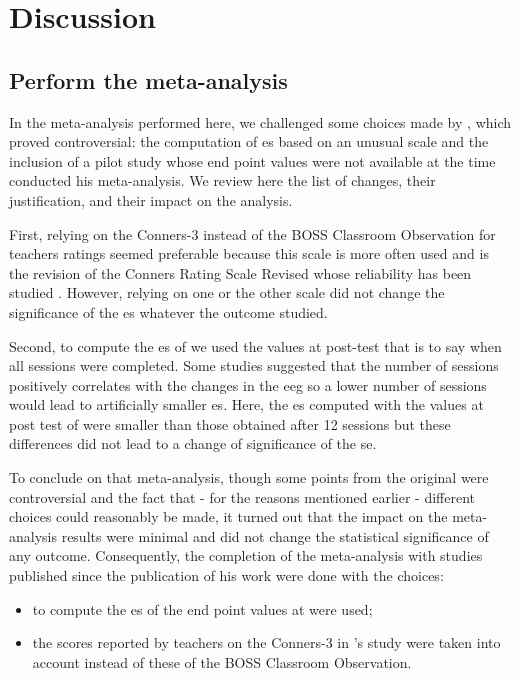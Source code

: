 


\section{Discussion}

\subsection{Perform the meta-analysis}
In the meta-analysis performed here, we challenged some choices made by \citeauthor{Cortese2016}, 
which proved controversial: the computation of \gls{es} based on an unusual scale \citep{Steiner2014} and the inclusion 
of a pilot study \citep{Arnold2014} whose end point values were not available at the time \citeauthor{Cortese2016} 
conducted his meta-analysis. We review here the list of changes, their justification, and their impact on the analysis.
 
First, relying on the Conners-3 \citep{Conners2008} instead of the BOSS Classroom Observation \citep{Shapiro2010} 
for teachers ratings seemed preferable because this scale is more often used \citep{Christiansen2014, 
Bluschke2016} and is the revision of the Conners Rating Scale Revised \citep{Conners1998} whose reliability has been studied 
\citep{Collett2003}. However, relying on one or the other scale did not change the significance of the \gls{es} whatever the outcome studied.

Second, to compute the \gls{es} of \citet{Arnold2014} we used the values at post-test
that is to say when all sessions were completed. Some studies suggested that the number of sessions positively 
correlates with the changes in the \gls{eeg} \citep{Vernon2004} so a lower number of sessions would lead to 
artificially smaller \gls{es}. Here, the \gls{es} computed with the values at post test of \citet{Arnold2014} 
were smaller than those obtained after 12 sessions but these differences did not lead to a change of significance 
of the \gls{se}. 

To conclude on that meta-analysis, though some points from the original were controversial and the fact that 
- for the reasons mentioned earlier - different choices could reasonably be made, 
it turned out that the impact on the meta-analysis results were minimal and did not change the statistical significance of any outcome. 
Consequently, the completion of the meta-analysis with studies published since the publication of his work were done with the choices: 
\begin{itemize} 
	\item to compute the \gls{es} of \citet{Arnold2014} the end point values at were used;
	\item the scores reported by teachers on the Conners-3 in \citeauthor{Steiner2014}'s study were taken into account instead of these of 
	the BOSS Classroom Observation.
\end{itemize} 

